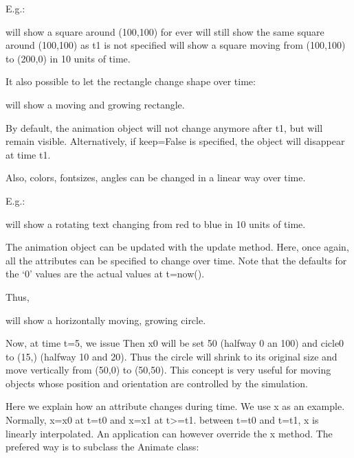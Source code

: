 \documentclass[letterpaper,10pt,english]{sphinxmanual}
\begin{document}
E.g.:

 will show a square around (100,100) for ever 
 will still show the same square around (100,100) as t1 is not specified 
 will show a square moving from (100,100) to (200,0) in 10 units of time. 

It also possible to let the rectangle change shape over time:

 will show a moving and growing rectangle. 

By default, the animation object will not change anymore after t1, but will remain visible. Alternatively, if
keep=False is specified, the object will disappear at time t1.

Also, colors, fontsizes, angles can be changed in a linear way over time.

E.g.:

 will show a rotating text changing from red to blue in 10 units of time.

The animation object can be updated with the update method. Here, once again, all the attributes can be specified to change over time. Note that the defaults for the ‘0’ values are the actual values at t=now().

Thus,

will show a horizontally moving, growing circle.

Now, at time t=5, we issue
Then x0 will be set 50 (halfway 0 an 100) and cicle0 to (15,) (halfway 10 and 20).
Thus the circle will shrink to its original size and move vertically from (50,0) to (50,50).
This concept is very useful for moving objects whose position and orientation are controlled by the simulation.

Here we explain how an attribute changes during time. We use x as an example.
Normally, x=x0 at t=t0 and x=x1 at t\textgreater{}=t1. between t=t0 and t=t1, x is linearly interpolated.
An application can however override the x method. The prefered way is to subclass the Animate class:
\end{document}
